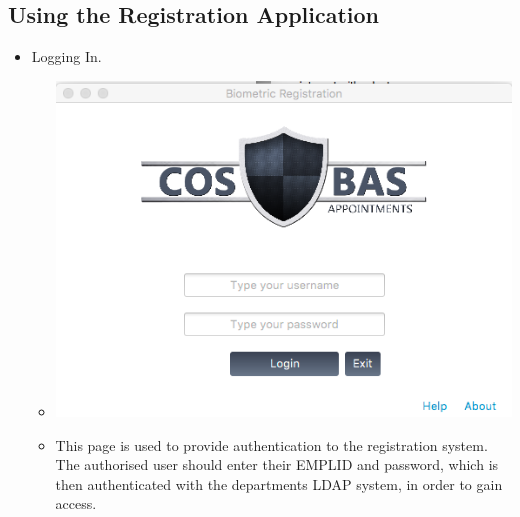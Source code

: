 \subsection{Using the Registration Application}
	\begin{itemize}
		\item Logging In.
			\begin{itemize}
				\item \includegraphics[width=\linewidth]{images/Screenshots/Registration/Login.png}
				\item This page is used to provide authentication to the registration system. The authorised user should enter their EMPLID and password, which is then authenticated with the departments LDAP system, in order to gain access.
			\end{itemize}
	\end{itemize}